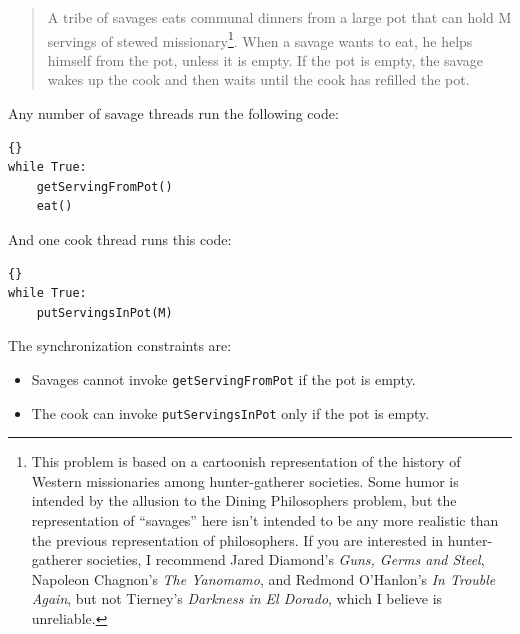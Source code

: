 \documentclass{book}
\begin{document}
\begin {quotation}
A tribe of savages eats communal dinners from a large pot that can
hold M servings of stewed missionary\footnote{This problem is based on
a cartoonish representation of the history of Western missionaries
among hunter-gatherer societies.  Some humor is intended by the
allusion to the Dining Philosophers problem, but the representation of
``savages'' here isn't intended to be any more realistic than the
previous representation of philosophers.  If you are interested in
hunter-gatherer societies, I recommend Jared Diamond's {\em Guns,
Germs and Steel}, Napoleon Chagnon's {\em The Yanomamo}, and Redmond
O'Hanlon's {\em In Trouble Again}, but not Tierney's {\em Darkness in
El Dorado}, which I believe is unreliable.}.  When a savage wants to
eat, he helps himself from the pot, unless it is empty.  If the pot is
empty, the savage wakes up the cook and then waits until the cook has
refilled the pot.
\end{quotation}

Any number of savage threads run the following code:

\begin{latin}
\begin{latin}
\begin{lstlisting}[title={Unsynchronized savage code}]{}
while True:
    getServingFromPot()
    eat()
\end{lstlisting}
\end{latin}
\end{latin}

And one cook thread runs this code:

\begin{latin}
\begin{latin}
\begin{lstlisting}[title={Unsynchronized cook code}]{}
while True:
    putServingsInPot(M)
\end{lstlisting}
\end{latin}
\end{latin}

The synchronization constraints are:

\begin{itemize}

\item Savages cannot invoke {\tt getServingFromPot} if the
pot is empty.

\item The cook can invoke {\tt putServingsInPot} only if
the pot is empty.

\end{itemize}
\end{document}
